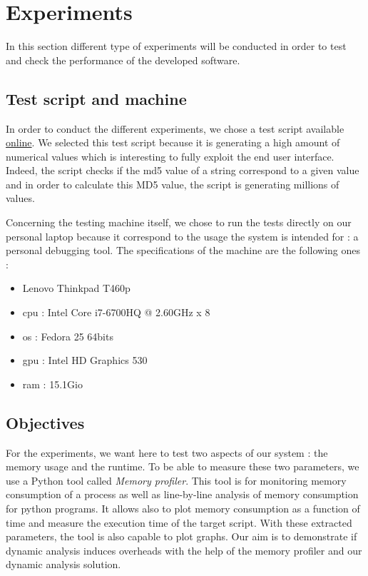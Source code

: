 

\chapter{Experiments} %
\label{chap:experiments}

In this section different type of experiments will be conducted in order to test and check the performance of the developed software.

\section{Test script and machine}
In order to conduct the different experiments, we chose a test script available \href{https://github.com/TheAlgorithms/Python/blob/master/hashes/md5.py}{online}. We selected this test script because it is generating a high amount of numerical values which is interesting to fully exploit the end user interface. Indeed, the script checks if the \gls{md5} value of a string correspond to a given value and in order to calculate this MD5 value, the script is generating millions of values.

Concerning the testing machine itself, we chose to run the tests directly on our personal laptop because it correspond to the usage the system is intended for : a personal debugging tool. The specifications of the machine are the following ones :
\begin{itemize}
  \item Lenovo Thinkpad T460p
  \item \gls{cpu} : Intel Core i7-6700HQ @ 2.60GHz x 8
  \item \gls{os} : Fedora 25 64bits
  \item \gls{gpu} : Intel HD Graphics 530
  \item \gls{ram} : 15.1Gio
\end{itemize}

\section{Objectives}
For the experiments, we want here to test two aspects of our system : the memory usage and the runtime. To be able to measure these two parameters, we use a Python tool called \textit{Memory profiler}. This tool is for monitoring memory consumption of a process as well as line-by-line analysis of memory consumption for python programs. It allows also to plot memory consumption as a function of time and measure the execution time of the target script. With these extracted parameters, the tool is also capable to plot graphs. Our aim is to demonstrate if dynamic analysis induces overheads with the help of the memory profiler and our dynamic analysis solution.

